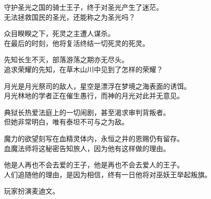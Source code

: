 守护圣光之国的骑士王子，终于对圣光产生了迷茫。\\
无法拯救国民的圣光，还能称之为圣光吗？

众目睽睽之下，死灵之主遭人谋杀。\\
在最后的时刻，他将复活终结一切死灵的死灵。

先知长生不灭，部落游荡之期亦无尽头。\\
追求荣耀的先知，在草木山川中见到了怎样的荣耀？

月光是月光祭司的敌人，星空是漂浮在梦境之海表面的诱饵。\\
月光林地的学者正在催生愚行，而神的月光对此并无意见。

典狱长热爱法庭上的一切闹剧，甚至渴求审判背叛者。\\
但她非常明白，唯有泰坦不可与之为敌。

魔力的欲望刻写在血精灵体内，永恒之井的恩赐仍有留存。\\
血魔法师将这秘密告知旅人，因为他有这样做的理由。

他是人再也不会去爱的王子，他是再也不会去爱人的王子。\\
人们追随他的理由，是因为相信，终有一日他将对巫妖王举起叛旗。
















\clearpage{} %


玩家扮演麦迪文。

